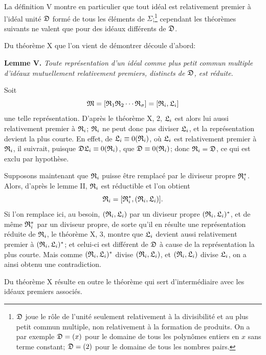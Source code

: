 La définition V montre en particulier que tout idéal est relativement premier à l'idéal unité $\mathfrak{D}$ formé de tous les éléments de $\Sigma$;\footnote{$\mathfrak{D}$ joue le rôle de l'unité seulement relativement à la divisibilité et au plus petit commun multiple, non relativement à la formation de produits. On a par exemple $\mathfrak{D}=(x)$ pour le domaine de tous les polynômes entiers en $x$ sans terme constant; $\mathfrak{D}=(2)$ pour le domaine de tous les nombres pairs.} cependant les théorèmes suivants ne valent que pour des idéaux différents de $\mathfrak{D}$.

Du théorème X que l'on vient de démontrer découle d'abord:

\textbf{Lemme V.} \emph{Toute représentation d'un idéal comme plus petit commun multiple d'idéaux mutuellement relativement premiers, distincts de $\mathfrak{D}$, est réduite.}

Soit
\[
 \mathfrak{M}=[\mathfrak{R}_1\mathfrak{R}_2\cdots\mathfrak{R}_\sigma]=[\mathfrak{R}_i,\mathfrak{L}_i]
\]
une telle représentation. D'après le théorème X, 2, $\mathfrak{L}_i$ est alors lui aussi relativement premier à $\mathfrak{R}_i$; $\mathfrak{R}_i$ ne peut donc pas diviser $\mathfrak{L}_i$, et la représentation devient la plus courte. En effet, de $\mathfrak{L}_i\equiv0(\mathfrak{R}_i)$, où $\mathfrak{L}_i$ est relativement premier à $\mathfrak{R}_i$, il suivrait, puisque $\mathfrak{D}\mathfrak{L}_i\equiv0(\mathfrak{R}_i)$, que $\mathfrak{D}\equiv0(\mathfrak{R}_i)$; donc $\mathfrak{R}_i=\mathfrak{D}$, ce qui est exclu par hypothèse.

Supposons maintenant que $\mathfrak{R}_i$ puisse être remplacé par le diviseur propre $\mathfrak{R}_i^*$. Alors, d'après le lemme II, $\mathfrak{R}_i$ est réductible et l'on obtient
\[
 \mathfrak{R}_i=[\mathfrak{R}_i^*,(\mathfrak{R}_i,\mathfrak{L}_i)].
\]
Si l'on remplace ici, au besoin, $(\mathfrak{R}_i,\mathfrak{L}_i)$ par un diviseur propre $(\mathfrak{R}_i,\mathfrak{L}_i)^*$, et de même $\mathfrak{R}_i^*$ par un diviseur propre, de sorte qu'il en résulte une représentation réduite de $\mathfrak{R}_i$, le théorème X, 3, montre que $\mathfrak{L}_i$ devient aussi relativement premier à $(\mathfrak{R}_i,\mathfrak{L}_i)^*$; et celui-ci est différent de $\mathfrak{D}$ à cause de la représentation la plus courte. Mais comme $(\mathfrak{R}_i,\mathfrak{L}_i)^*$ divise $(\mathfrak{R}_i,\mathfrak{L}_i)$, et $(\mathfrak{R}_i,\mathfrak{L}_i)$ divise $\mathfrak{L}_i$, on a ainsi obtenu une contradiction.

Du théorème X résulte en outre le théorème qui sert d'intermédiaire avec les idéaux premiers associés.

